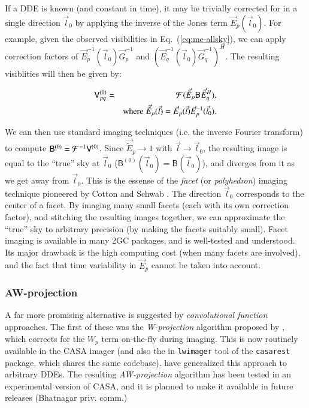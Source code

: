 \documentclass{aa}
\newcommand{\herm}{H}
\newcommand{\jones}[2]{\vec {#1}_{#2}}
\newcommand{\jonesinv}[2]{\vec {#1}^{-1}_{#2}}
\newcommand{\jonesT}[2]{\vec {#1}^{\herm}_{#2}}
\newcommand{\coh}[2]{\mathsf{{#1}}_{{#2}}}
\begin{document}
If a DDE is known (and constant in time), it may be trivially corrected for in a single direction $\vec l_0$ by applying the inverse of the Jones term $\jones{E}{p}(\vec l_0)$. For example, given the observed visibilities in Eq.~(\ref{eq:me-allsky}), we can apply correction factors of $\jonesinv{E}{p}(\vec l_0)\jonesinv{G}{p}$ and $(\jonesinv{E}{q}(\vec l_0)\jonesinv{G}{q})^{\herm}$. The resulting visiblities will then be given by:

\begin{eqnarray*}
\coh{V}{pq}^{(0)} & = & {\cal F}( \jones{\tilde E}{p} \coh{B}{} \jonesT{\tilde E}{q} ), \\
 & & \mathrm{where} \; \jones{\tilde E}{p}(\vec l) = \jones{E}{p}(\vec l)\jonesinv{E}{p}(\vec l_0).
\end{eqnarray*}

We can then use standard imaging techniques (i.e. the inverse Fourier transform) to compute $\coh{B}{}^{(0)} = {\cal F}^{-1}\coh{V}{}^{(0)}$. Since $\jones{\tilde E}{p}\to1$ with $\vec l \to \vec l_0$, the resulting image is equal to the ``true'' sky at $\vec l_0$  ($\coh{B}{}^{(0)}(\vec l_0) =  \coh{B}{}(\vec l_0)$), and diverges from it as we get away from $\vec l_0$. This is the essense of the \emph{facet} (or \emph{polyhedron}) imaging technique pioneered by Cotton and Schwab \citep[for an overview, see][]{faceting}. The direction $\vec l_0$ corresponds to the center of a facet. By imaging many small facets (each with its own correction factor), and stitching the resulting images together, we can approximate the ``true'' sky to arbitrary precision (by making the facets suitably small). Facet imaging is available in many 2GC packages, and is well-tested and understood. Its major drawback is the high computing cost (when many facets are involved), and the fact that time variability in $\jones{E}{p}$ cannot be taken into account. 

\subsubsection{AW-projection}

A far more promising alternative is suggested by \emph{convolutional function} approaches. The first of these was the \emph{W-projection} algorithm proposed by \citet{Cornwell:wproj}, which corrects for the $W_p$ term on-the-fly during imaging. This is now routinely available in the CASA imager (and also the in {\tt lwimager} tool of the {\tt casarest} package, which shares the same codebase). \citet{SB:imageplane} have generalized this approach to arbitrary DDEs. The resulting \emph{AW-projection} algorithm has been tested in an experimental version of CASA, and it is planned to make it available in future releases (Bhatnagar priv. comm.)
\end{document}
